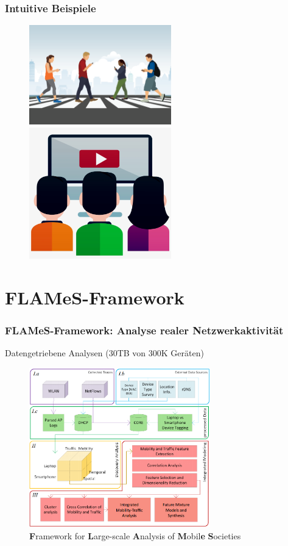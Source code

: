 \documentclass{beamer}
\begin{document}
\begin{frame}
  \frametitle{Intuitive Beispiele \cite{PI}}
  \begin{figure}
    \centering
    \includegraphics[width=0.55\textwidth]{images/smartphone_walking.png}
    \includegraphics[width=0.55\textwidth]{images/watching_tv.jpeg}
  \end{figure}
\end{frame}

\section{FLAMeS-Framework}

\begin{frame}
\frametitle{FLAMeS-Framework: Analyse realer Netzwerkaktivität}
  \centering
  Datengetriebene Analysen ($30$\textsc{TB} von $300$\textsc{K} Geräten)
  \begin{figure}
    \centering
    \includegraphics[width=0.7\textwidth]{images/FLAMeS.png}
    \caption*{\textbf{F}ramework for \textbf{L}arge-scale \textbf{A}nalysis of \textbf{M}obil\textbf{e} \textbf{S}ocieties
    \cite{Alipour2018}}
  \end{figure}  
\end{frame}
\end{document}
